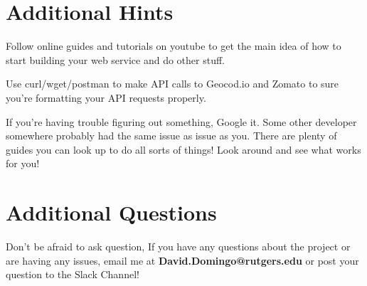 \documentclass{article}
\begin{document}

\section*{Additional Hints} %
\begin{info}
Follow online guides and tutorials on youtube to get the main idea of how to start building your web service and do other stuff.
\end{info}
\begin{info}
Use curl/wget/postman to make API calls to Geocod.io and Zomato to sure you're formatting your API requests properly. 
\end{info}
\begin{info}
If you're having trouble figuring out something, Google it. Some other developer somewhere probably had the same issue as issue as you. There are plenty of guides you can look up to do all sorts of things! Look around and see what works for you!
\end{info}



\section*{Additional Questions} %
Don't be afraid to ask question, If you have any questions about the project or are having any issues, email me at \textbf{David.Domingo@rutgers.edu} or post your question to the Slack Channel!

%
\end{document}
